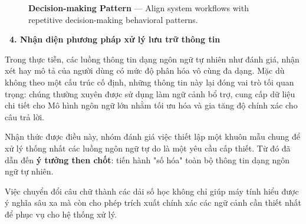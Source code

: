 \documentclass[12pt, a4paper]{article}
\begin{document}
\begin{figure}[H]
    \centering
    \caption{\textbf{Decision-making Pattern} --- Align system workflows with repetitive decision-making behavioral patterns.}
\end{figure}

\vspace{0.4cm}
\noindent\textcolor{purple!80!black}{\textbf{\faStar \ 4. Nhận diện phương pháp xử lý lưu trữ thông tin}}
\vspace{0.15cm}

\begin{tcolorbox}[blanker, borderline west={3pt}{0pt}{purple!60!black}, left=12pt, top=2pt, bottom=2pt]
Trong thực tiễn, các luồng thông tin dạng ngôn ngữ tự nhiên như đánh giá, nhận xét hay mô tả của người dùng có mức độ phân hóa vô cùng đa dạng. Mặc dù không theo một cấu trúc cố định, những thông tin này lại đóng vai trò tối quan trọng: chúng thường xuyên được sử dụng làm ngữ cảnh bổ trợ, cung cấp dữ liệu chi tiết cho Mô hình ngôn ngữ lớn nhằm tối ưu hóa và gia tăng độ chính xác cho câu trả lời.

\vspace{0.15cm}
\noindent Nhận thức được điều này, nhóm đánh giá việc thiết lập một khuôn mẫu chung để xử lý thống nhất các luồng ngôn ngữ tự do là một yêu cầu cấp thiết. Từ đó đã dẫn đến \textbf{ý tưởng then chốt}: tiến hành "số hóa" toàn bộ thông tin dạng ngôn ngữ tự nhiên.

\vspace{0.15cm}
\noindent Việc chuyển đổi câu chữ thành các dải số học không chỉ giúp máy tính hiểu được ý nghĩa sâu xa mà còn cho phép trích xuất chính xác các ngữ cảnh cần thiết nhất để phục vụ cho hệ thống xử lý.
\end{tcolorbox}
\end{document}
